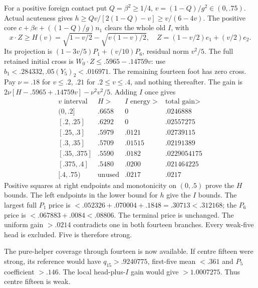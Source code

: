 \documentclass[11pt]{article}
\theoremstyle{definition}
\theoremstyle{remark}
\begin{document}
For a positive foreign contact put \(Q=\beta^2\ge1/4\),
\(v=(1-Q)/g^2\in(0,.75)\). Actual acuteness gives
\(h\ge Qv/[2(1-Q)-v]\ge v/(6-4v)\). The positive core
\(c+\beta e+((1-Q)/g)n_1\) clears the whole old \(I\), with
\[
 x\cdot Z\ge H(v)=\sqrt{1-v/2}-\sqrt{v(1-v)/2},\quad
 Z=(1-v/2)e_1+(v/2)e_2.
\]
Its projection is \((1-3v/5)P_1+(v/10)P_6\), residual norm
\(v^2/5\). The full retained initial cross is
\(W_0\cdot Z\le.5965-.14759v\): use
\(b_1<.284332,.05(Y_5)_2<.016971\). The remaining fourteen
foot has zero cross. Pay \(\nu=.18\) for \(v\le.2\),
\(.21\) for \(.2\le v\le.4\), and nothing thereafter. The gain is
\(2\nu[H-.5965+.14759v]-\nu^2v^2/5\). Adding \(I\) once gives
\[
\begin{array}{c|c|c|c}
v\text{ interval}&H>&I\text{ energy}>&\text{total gain}>\\\hline
(0,.2]&.6658&0&.0246888\\{}[.2,.25]&.6292&0&.02557275\\
{}[.25,.3]&.5979&.0121&.02739115\\{}[.3,.35]&.5709&.01515&.02191389\\
{}[.35,.375]&.5590&.0182&.0229054175\\
{}[.375,.4]&.5480&.0200&.021464225\\
{}[.4,.75)&\text{unused}&.0217&.0217
\end{array}
\]
Positive squares at right endpoints and monotonicity on \((0,.5)\)
prove the \(H\) bounds. The left endpoints in the lower bound for
\(h\) give the \(I\) bounds. The largest full \(P_1\) price is
\(<.052326+.070004+.1848=.30713<.312168\); the \(P_6\) price is
\(<.067883+.0084<.08806\). The terminal price is unchanged.
The uniform gain \(>.0214\) contradicts one in both fourteen
branches. Every weak-five head is excluded. Five is therefore strong.

The pure-helper coverage through fourteen is now available. If centre
fifteen were strong, its reference would have \(q_{15}>.9240775\),
first-five mean \(<.361\) and \(P_5\) coefficient \(>.146\).
The local head-plus-\(I\) gain would give \(>1.0007275\).
Thus centre fifteen is weak.
\end{document}
